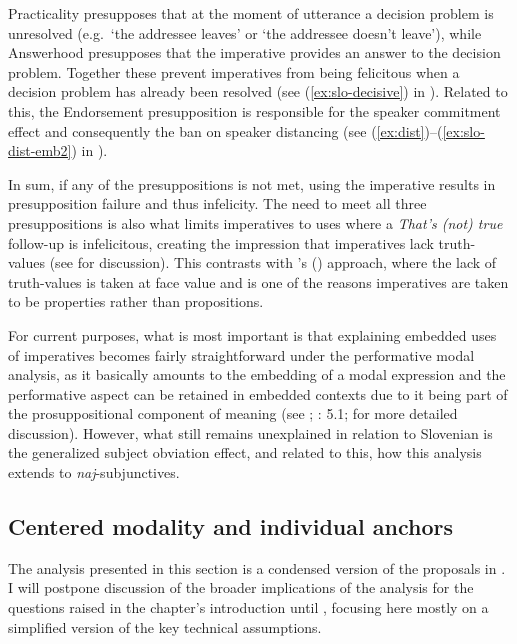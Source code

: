 \documentclass[output=paper,colorlinks,citecolor=brown]{langscibook}
\begin{document}
\noindent Practicality presupposes that at the moment of utterance a decision problem is unresolved (e.g.\ `the addressee leaves' or `the addressee doesn't leave'), while Answerhood presupposes that the imperative provides an answer to the decision problem. Together these prevent imperatives from being felicitous when a decision problem has already been resolved (see (\ref{ex:slo-decisive}) in ). Related to this, the Endorsement presupposition is responsible for the speaker commitment effect and consequently the ban on speaker distancing (see (\ref{ex:dist})--(\ref{ex:slo-dist-emb2}) in ). 

 In sum, if any of the presuppositions is not met, using the imperative results in presupposition failure and thus infelicity. The need to meet all three presuppositions is also what limits imperatives to uses where a  \emph{That's (not) true} follow-up is infelicitous, creating the impression that imperatives lack truth-values (see \cite[][4.3]{kaufmannBOOK} for discussion). This contrasts with \citeauthor{portnerSALT}'s (\citeyear{portnerSALT,portner07}) approach, where the lack of truth-values is taken at face value and is one of the reasons imperatives are taken to be properties rather than propositions.    

For current purposes, what is most important is that explaining embedded uses of imperatives becomes fairly straightforward under the performative modal analysis, as it basically amounts to the embedding of a modal expression and the performative aspect can be retained in embedded contexts due to it being part of the prosuppositional component of meaning (see \cite[][Ch.\,6]{kaufmannBOOK}; \citeyear{kaufmann21}: 5.1; \cite{stegoveckaufmann}  for more detailed discussion). However, what still remains unexplained in relation to Slovenian is the generalized subject obviation effect, and related to this, how this analysis extends to \emph{naj}-subjunctives.

\subsection{Centered modality and individual anchors}
\label{subsec:perspective}

The analysis presented in this section is a condensed version of the proposals in \citet{Stegovec2017,stegovec19}. I will postpone discussion of the broader implications of the analysis for the questions raised in the chapter's introduction until , focusing here mostly on a simplified version of the key technical assumptions.
\end{document}
